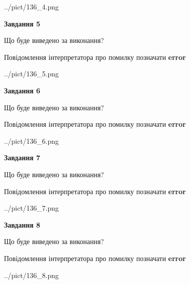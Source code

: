 \documentclass[12pt, ukrainian]{article}
\begin{document}
{\begin{center}
	{../pict/136_4.png}
\end{center}
\newpage

{\begin {center}\textbf{Завдання 5}\end {center}}\par
Що буде виведено за виконання? \par
Повідомлення інтерпретатора про помилку позначати \textbf{error}

\begin{center}
	{../pict/136_5.png}
\end{center}
\newpage

{\begin {center}\textbf{Завдання 6}\end {center}}\par
Що буде виведено за виконання? \par
Повідомлення інтерпретатора про помилку позначати \textbf{error}

\begin{center}
	{../pict/136_6.png}
\end{center}
\newpage

{\begin {center}\textbf{Завдання 7}\end {center}}\par
Що буде виведено за виконання? \par
Повідомлення інтерпретатора про помилку позначати \textbf{error}

\begin{center}
	{../pict/136_7.png}
\end{center}
\newpage

{\begin {center}\textbf{Завдання 8}\end {center}}\par
Що буде виведено за виконання? \par
Повідомлення інтерпретатора про помилку позначати \textbf{error}

\begin{center}
	{../pict/136_8.png}
\end{center}
\newpage

}
\end{document}
